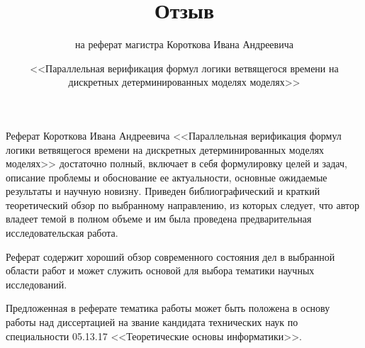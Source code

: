 \documentclass[a4paper,12pt,notitlepage]{article}
\title{Отзыв}
\date{\normalsize{<<Параллельная верификация формул логики ветвящегося времени на
    дискретных детерминированных моделях моделях>>}}
\author{\small{на реферат магистра Короткова Ивана Андреевича}}
\begin{document}
\maketitle

\thispagestyle{empty}

Реферат Короткова Ивана Андреевича <<Параллельная верификация формул логики ветвящегося
времени на дискретных детерминированных моделях моделях>> достаточно полный, включает в
себя формулировку целей и задач, описание проблемы и обоснование ее актуальности, основные
ожидаемые результаты и научную новизну. Приведен библиографический и краткий теоретический
обзор по выбранному направлению, из которых следует, что автор владеет темой в полном
объеме и им была проведена предварительная исследовательская работа.

Реферат содержит хороший обзор современного состояния дел в выбранной области работ и
может служить основой для выбора тематики научных исследований.

Предложенная в реферате тематика работы может быть положена в основу работы над
диссертацией на звание кандидата технических наук по специальности 05.13.17
<<Теоретические основы информатики>>.

\end{document}
